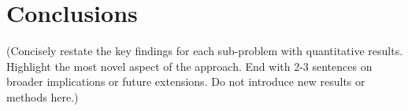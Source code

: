 \section{Conclusions}

(Concisely restate the key findings for each sub-problem with quantitative
results. Highlight the most novel aspect of the approach. End with 2-3
sentences on broader implications or future extensions.
Do not introduce new results or methods here.)
